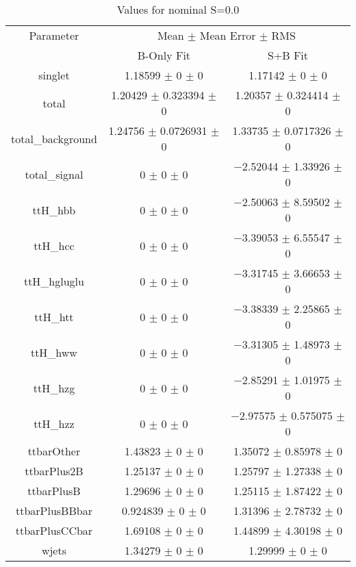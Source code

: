 \begin{table}
\centering
\caption{Values for nominal S=0.0}
\begin{tabular}{ccc}
\toprule
Parameter & \multicolumn{2}{c}{Mean $\pm$ Mean Error $\pm$ RMS}\\
 & B-Only Fit & S+B Fit\\
\midrule
singlet & \num{1.18599} $\pm$ \num{0} $\pm$ \num{0} & \num{1.17142} $\pm$ \num{0} $\pm$ \num{0}\\
total & \num{1.20429} $\pm$ \num{0.323394} $\pm$ \num{0} & \num{1.20357} $\pm$ \num{0.324414} $\pm$ \num{0}\\
total\_background & \num{1.24756} $\pm$ \num{0.0726931} $\pm$ \num{0} & \num{1.33735} $\pm$ \num{0.0717326} $\pm$ \num{0}\\
total\_signal & \num{0} $\pm$ \num{0} $\pm$ \num{0} & \num{-2.52044} $\pm$ \num{1.33926} $\pm$ \num{0}\\
ttH\_hbb & \num{0} $\pm$ \num{0} $\pm$ \num{0} & \num{-2.50063} $\pm$ \num{8.59502} $\pm$ \num{0}\\
ttH\_hcc & \num{0} $\pm$ \num{0} $\pm$ \num{0} & \num{-3.39053} $\pm$ \num{6.55547} $\pm$ \num{0}\\
ttH\_hgluglu & \num{0} $\pm$ \num{0} $\pm$ \num{0} & \num{-3.31745} $\pm$ \num{3.66653} $\pm$ \num{0}\\
ttH\_htt & \num{0} $\pm$ \num{0} $\pm$ \num{0} & \num{-3.38339} $\pm$ \num{2.25865} $\pm$ \num{0}\\
ttH\_hww & \num{0} $\pm$ \num{0} $\pm$ \num{0} & \num{-3.31305} $\pm$ \num{1.48973} $\pm$ \num{0}\\
ttH\_hzg & \num{0} $\pm$ \num{0} $\pm$ \num{0} & \num{-2.85291} $\pm$ \num{1.01975} $\pm$ \num{0}\\
ttH\_hzz & \num{0} $\pm$ \num{0} $\pm$ \num{0} & \num{-2.97575} $\pm$ \num{0.575075} $\pm$ \num{0}\\
ttbarOther & \num{1.43823} $\pm$ \num{0} $\pm$ \num{0} & \num{1.35072} $\pm$ \num{0.85978} $\pm$ \num{0}\\
ttbarPlus2B & \num{1.25137} $\pm$ \num{0} $\pm$ \num{0} & \num{1.25797} $\pm$ \num{1.27338} $\pm$ \num{0}\\
ttbarPlusB & \num{1.29696} $\pm$ \num{0} $\pm$ \num{0} & \num{1.25115} $\pm$ \num{1.87422} $\pm$ \num{0}\\
ttbarPlusBBbar & \num{0.924839} $\pm$ \num{0} $\pm$ \num{0} & \num{1.31396} $\pm$ \num{2.78732} $\pm$ \num{0}\\
ttbarPlusCCbar & \num{1.69108} $\pm$ \num{0} $\pm$ \num{0} & \num{1.44899} $\pm$ \num{4.30198} $\pm$ \num{0}\\
wjets & \num{1.34279} $\pm$ \num{0} $\pm$ \num{0} & \num{1.29999} $\pm$ \num{0} $\pm$ \num{0}\\
\bottomrule
\end{tabular}
\end{table}
